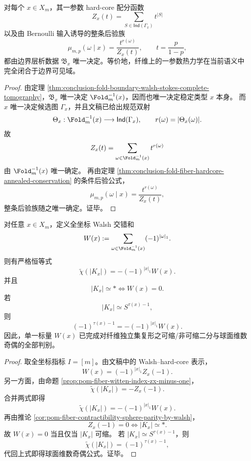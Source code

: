 \begin{theorem}[纤维热力学的边界全息封闭]\label{thm:conclusion-fold-fiber-thermodynamics-boundary-holographic-closure}
对每个 \(x\in X_m\)，其一参数 hard-core 配分函数
\[
Z_x(t)=\sum_{S\in \mathsf{Ind}(\Gamma_x)} t^{|S|}
\]
以及由 Bernoulli 输入诱导的整条后验族
\[
\mu_{m,p}(\omega\mid x)=\frac{t^{r(\omega)}}{Z_x(t)},
\qquad
t=\frac{p}{1-p},
\]
都由边界层析数据 \(\mathfrak B_x\) 唯一决定。等价地，纤维上的一参数热力学在当前语义中完全闭合于边界可见域。
\end{theorem}
\begin{proof}
由定理 \ref{thm:conclusion-fold-boundary-walsh-stokes-complete-tomography}，\(\mathfrak B_x\) 唯一决定 \(\Fold_m^{-1}(x)\)，因而也唯一决定稳定类型 \(x\) 本身。
而 \(x\) 唯一决定候选图 \(\Gamma_x\)，并且文稿已给出规范双射
\[
\Theta_x:\Fold_m^{-1}(x)\longrightarrow \mathsf{Ind}(\Gamma_x),
\qquad
r(\omega)=|\Theta_x(\omega)|.
\]
故
\[
Z_x(t)=\sum_{\omega\in \Fold_m^{-1}(x)} t^{r(\omega)}
\]
由 \(\Fold_m^{-1}(x)\) 唯一确定。
再由定理 \ref{thm:conclusion-fold-fiber-hardcore-annealed-conservation} 的条件后验公式，
\[
\mu_{m,p}(\omega\mid x)=\frac{t^{r(\omega)}}{Z_x(t)},
\]
整条后验族随之唯一确定。证毕。
\end{proof}

\begin{theorem}[边界拓扑读出的判别完备性]\label{thm:conclusion-fold-boundary-topology-readout-completeness}
对任意 \(x\in X_m\)，定义全坐标 Walsh 交错和
\[
W(x):=\sum_{\omega\in \Fold_m^{-1}(x)}(-1)^{|\omega|_1}.
\]
则有严格恒等式
\[
\widetilde\chi(|K_x|)
=
-(-1)^{|x|_1}W(x).
\]
并且
\[
|K_x|\simeq *
\iff
W(x)=0.
\]
若
\[
|K_x|\simeq S^{\tau(x)-1},
\]
则
\[
(-1)^{\tau(x)-1}=-(-1)^{|x|_1}W(x).
\]
因此，单一标量 \(W(x)\) 已完成对纤维独立集复形之可缩/非可缩二分与球面维数奇偶的全部判别。
\end{theorem}
\begin{proof}
取全坐标指标 \(I=[m]\)。由文稿中的 Walsh--hard-core 表示，
\[
W(x)=(-1)^{|x|_1}Z_x(-1).
\]
另一方面，由命题 \ref{prop:pom-fiber-witten-index-zx-minus-one}，
\[
\widetilde\chi(|K_x|)=-Z_x(-1).
\]
合并两式即得
\[
\widetilde\chi(|K_x|)=-(-1)^{|x|_1}W(x).
\]
再由推论 \ref{cor:pom-fiber-contractibility-sphere-parity-by-walsh}，
\[
Z_x(-1)=0 \iff |K_x|\simeq *.
\]
故 \(W(x)=0\) 当且仅当 \(|K_x|\) 可缩。
若 \(|K_x|\simeq S^{\tau(x)-1}\)，则
\[
\widetilde\chi(|K_x|)=(-1)^{\tau(x)-1},
\]
代回上式即得球面维数奇偶公式。证毕。
\end{proof}
